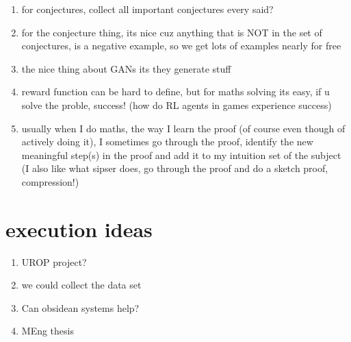\documentclass[11pt]{article}
\begin{document}
\begin{enumerate}
\item for conjectures, collect all important conjectures every said?
\item for the conjecture thing, its nice cuz anything that is NOT in the set of conjectures, is a negative example, so we get lots of examples nearly for free
\item the nice thing about GANs its they generate stuff
\item reward function can be hard to define, but for maths solving its easy, if u solve the proble, success! (how do RL agents in games experience success)
\item usually when I do maths, the way I learn the proof (of course even though of actively doing it), I sometimes go through the proof, identify the new meaningful step(s) in the proof and add it to my intuition set of the subject (I also like what sipser does, go through the proof and do a sketch proof, compression!)
\end{enumerate}

\section{execution ideas}

\begin{enumerate}
\item UROP project?
\item we could collect the data set
\item Can obsidean systems help?
\item MEng thesis
\end{enumerate}

\printbibliography
\end{document}
